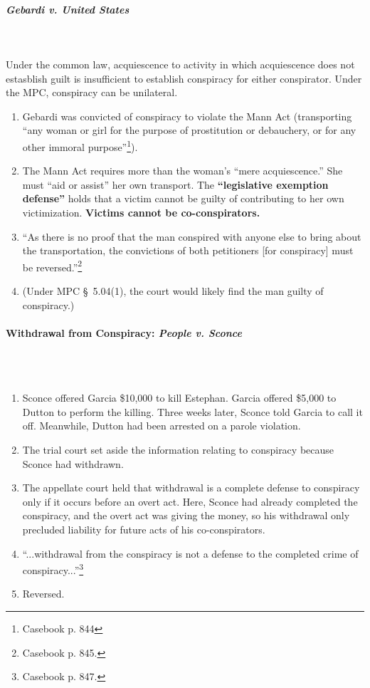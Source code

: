 \paragraph{\emph{Gebardi v. United States}}
~\\\\
Under the common law, acquiescence to activity in which acquiescence does not 
estasblish guilt is insufficient to establish conspiracy for either 
conspirator. Under the MPC, conspiracy can be unilateral.

\begin{enumerate}
    \item Gebardi was convicted of conspiracy to violate the Mann Act 
    (transporting ``any woman or girl for the purpose of prostitution or 
    debauchery, or for any other immoral purpose''\footnote{Casebook p. 844}).
    \item The Mann Act requires more than the woman's ``mere acquiescence.'' 
    She must ``aid or assist'' her own transport. The \textbf{``legislative 
    exemption defense''} holds that a victim cannot be guilty of contributing 
    to her own victimization. \textbf{Victims cannot be co-conspirators.}
    \item ``As there is no proof that the man conspired with anyone else to 
    bring about the transportation, the convictions of both petitioners [for 
    conspiracy] must be reversed.''\footnote{Casebook p. 845.}
    \item (Under MPC \S\ 5.04(1), the court would likely find the man guilty 
    of conspiracy.)
\end{enumerate}

\paragraph{Withdrawal from Conspiracy: \emph{People v. Sconce}}
~\\\\
\begin{enumerate}
    \item Sconce offered Garcia \$10,000 to kill Estephan. Garcia offered 
    \$5,000 to Dutton to perform the killing. Three weeks later, Sconce told 
    Garcia to call it off. Meanwhile, Dutton had been arrested on a parole 
    violation.
    \item The trial court set aside the information relating to conspiracy 
    because Sconce had withdrawn.
    \item The appellate court held that withdrawal is a complete defense to 
    conspiracy only if it occurs before an overt act. Here, Sconce had already 
    completed the conspiracy, and the overt act was giving the money, so his 
    withdrawal only precluded liability for future acts of his 
    co-conspirators.
    \item ``...withdrawal from the conspiracy is not a defense to the 
    completed crime of conspiracy...''\footnote{Casebook p. 847.}
    \item Reversed.
\end{enumerate}

